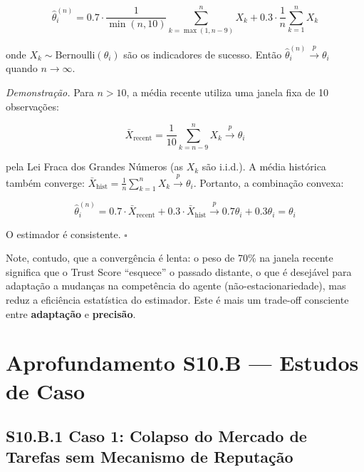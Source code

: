 \begin{equation}
\hat{\theta}_i^{(n)} = 0.7 \cdot \frac{1}{\min(n, 10)} \sum_{k=\max(1, n-9)}^{n} X_k + 0.3 \cdot \frac{1}{n} \sum_{k=1}^{n} X_k
\end{equation}

onde $X_k \sim \text{Bernoulli}(\theta_i)$ são os indicadores de sucesso. Então $\hat{\theta}_i^{(n)} \xrightarrow{p} \theta_i$ quando $n \to \infty$.

\textit{Demonstração.} Para $n > 10$, a média recente utiliza uma janela fixa de 10 observações:

\begin{equation}
\bar{X}_{\text{recent}} = \frac{1}{10} \sum_{k=n-9}^{n} X_k \xrightarrow{p} \theta_i
\end{equation}

pela Lei Fraca dos Grandes Números (as $X_k$ são i.i.d.). A média histórica também converge: $\bar{X}_{\text{hist}} = \frac{1}{n} \sum_{k=1}^{n} X_k \xrightarrow{p} \theta_i$. Portanto, a combinação convexa:

\begin{equation}
\hat{\theta}_i^{(n)} = 0.7 \cdot \bar{X}_{\text{recent}} + 0.3 \cdot \bar{X}_{\text{hist}} \xrightarrow{p} 0.7\theta_i + 0.3\theta_i = \theta_i
\end{equation}

O estimador é consistente. \hfill $\square$

Note, contudo, que a convergência é lenta: o peso de 70\% na janela recente significa que o Trust Score ``esquece'' o passado distante, o que é desejável para adaptação a mudanças na competência do agente (não-estacionariedade), mas reduz a eficiência estatística do estimador. Este é mais um trade-off consciente entre \textbf{adaptação} e \textbf{precisão}.


\section*{Aprofundamento S10.B --- Estudos de Caso}

\subsection*{S10.B.1 Caso 1: Colapso do Mercado de Tarefas sem Mecanismo de Reputação}

